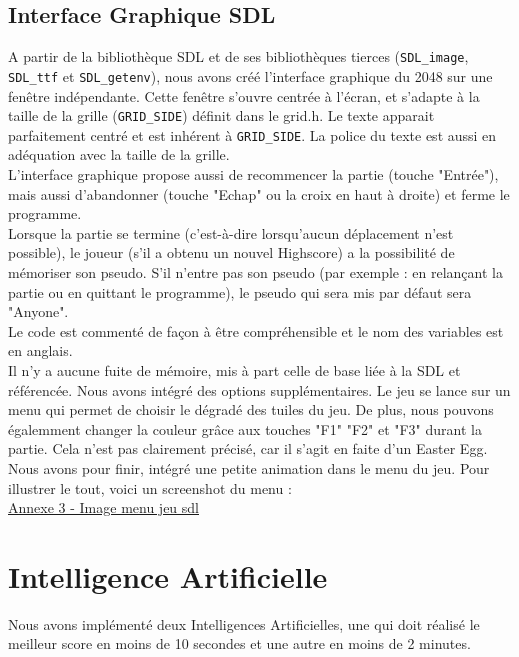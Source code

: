 \documentclass[a4paper]{article}
\begin{document}
 \subsection{Interface Graphique SDL}
 \label{sec-4-2}

 A partir de la bibliothèque SDL et de ses bibliothèques tierces (\texttt{SDL\_image}, 
 \texttt{SDL\_ttf} et \texttt{SDL\_getenv}), nous avons créé l'interface graphique du 2048 sur 
 une fenêtre indépendante. Cette fenêtre s'ouvre centrée à l'écran, et s'adapte
 à la taille de la grille (\texttt{GRID\_SIDE}) définit dans le grid.h.
 Le texte apparait parfaitement centré et est inhérent à \texttt{GRID\_SIDE}. La police
 du texte est aussi en adéquation avec la taille de la grille.\\
 L'interface graphique propose aussi de recommencer la partie (touche "Entrée"),
 mais aussi d'abandonner (touche "Echap" ou la croix en haut à droite) et ferme 
 le programme.\\
 Lorsque la partie se termine (c'est-à-dire lorsqu'aucun déplacement n'est possible),
 le joueur (s'il a obtenu un nouvel Highscore) a la possibilité de mémoriser son 
 pseudo. S'il n'entre pas son pseudo (par exemple : en relançant la partie ou en quittant le programme),
 le pseudo qui sera mis par défaut sera "Anyone".\\
 Le code est commenté de façon à être compréhensible et le nom des variables
 est en anglais.\\
 Il n'y a aucune fuite de mémoire, mis à part celle de base liée à la
 SDL et référencée.
 \vspace{0.2cm}
 \noindent
 Nous avons intégré des options supplémentaires. Le jeu se lance sur un
 menu qui permet de choisir le dégradé des tuiles du jeu. De plus, nous
 pouvons égalemment changer la couleur grâce aux touches "F1" "F2" et "F3" durant la partie.
 Cela n'est pas clairement précisé, car il s'agit en faite d'un Easter Egg.\\
 Nous avons pour finir, intégré une petite animation dans le menu du jeu.
 Pour illustrer le tout, voici un screenshot du menu :\\
 \hyperref[sec-7-3]{Annexe 3 - Image menu jeu sdl}

 \newpage
 \section{Intelligence Artificielle}
 \label{sec-5}

 Nous avons implémenté deux Intelligences Artificielles, une qui doit
 réalisé le meilleur score en moins de 10 secondes et une autre en moins de 2
 minutes.
\end{document}
